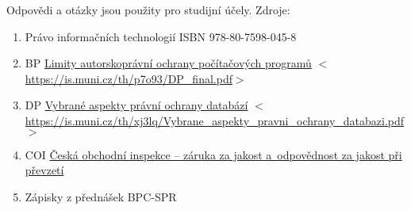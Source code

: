 \noindent Odpovědi a otázky jsou použity pro studijní účely. \newline
Zdroje:
\begin{enumerate}
    \item Právo informačních technologií ISBN 978-80-7598-045-8
    \item BP \href{https://is.muni.cz/th/p7o93/DP_final.pdf}{Limity autorskoprávní ochrany počítačových programů} \(<\)\url{https://is.muni.cz/th/p7o93/DP_final.pdf}\(>\)
    \item DP \href{https://is.muni.cz/th/xj3lq/Vybrane_aspekty_pravni_ochrany_databazi.pdf}{Vybrané aspekty právní ochrany databází} \(<\)\url{https://is.muni.cz/th/xj3lq/Vybrane_aspekty_pravni_ochrany_databazi.pdf}\(>\)
    \item COI \href{https://www.coi.cz/pro-podnikatele/informace-pro-prodejce-zbozi-a-sluzeb/zaruka-za-jakost-a-odpovednost-za-jakost-pri-prevzeti/}{Česká obchodní inspekce -- záruka za jakost a~odpovědnost za jakost při převzetí}
    \item Zápisky z přednášek BPC-SPR
\end{enumerate}

